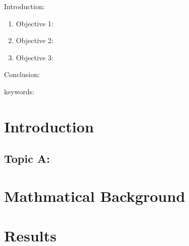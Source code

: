 

\twocolumn
\scriptsize
\begin{frontmatter}
		\title{}
		\author{}
		\address{The Mathematical Learning Space}
\end{frontmatter}	

Introduction:
\begin{enumerate}
\item Objective 1:
\item Objective 2:
\item Objective 3:
\end{enumerate}
Conclusion:

keywords:


\section{Introduction}




\subsection{Topic A:}

\section{Mathmatical Background}

\section{Results}




\begin{thebibliography}{00}

\end{thebibliography}



